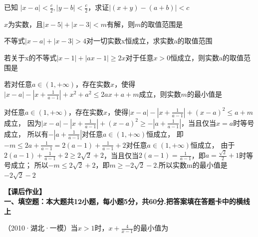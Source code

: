 \documentclass[11pt,a4paper]{ctexbook}
\begin{document}
\par
\begin{problem}
    已知 $\displaystyle |x-a|<\frac{c}{2},|y-b|<\frac{c}{2}$，求证$|(x+y)-(a+b)|<c$ 
\end{problem}

\par
\begin{problem}
    $x$为实数，且$|x-5|+|x-3|<m$有解，则$m$的取值范围是
\end{problem}

\par
\begin{problem}
    不等式$|x-a|+|x-3|>4$对一切实数x恒成立，求实数a的取值范围
\end{problem}

\par
\begin{problem}
    若关于x的不等式$|x-1|+|ax-1|\ge2x$对于任意$x>0$恒成立，则实数a的取值范围是\tiankong{$(-\infty,-1]\cup[3,+\infty)$} 
\end{problem}

\par
\begin{problem}
    若对任意$a\in(1,+\infty)$，存在实数$x$，使得$\displaystyle |x-a|-|x+\frac{1}{a-1}|+x^2+a^2\le 2ax+a+m$成立，则实数$m$的最小值是
    \begin{jiexi}
        对任意$a\in(1,+\infty)$，存在实数$x$，使得$\displaystyle |x-a|-|x+\frac{1}{a-1}|+(x-a)^2\le a+m$成立，
因为$\displaystyle |x-a|-|x+\frac{1}{a-1}|+(x-a)^2\ge -|a+\frac{1}{a-1}|$，当且仅当$x=a$时等号成立，
所以有$-|a+\frac{1}{a-1}|$对任意$a\in(1,+\infty)$恒成立，
即$\displaystyle -m\le 2a+\frac{1}{a-1}=2(a-1)+\frac{1}{a-1}+2$对任意$a\in(1,+\infty)$恒成立，
由于$\displaystyle 2(a-1)+\frac{1}{a-1}+2\ge 2\sqrt{2}+2$，当且仅当$\displaystyle 2(a-1)=\frac{1}{a-1}$，即$\displaystyle a=\frac{\sqrt{2}}{2}+1$时等号成立；
所以$-m\le2\sqrt{2}+2$，即$m\ge -2\sqrt{2}-2$.所以实数m的最小值是$-2\sqrt{2}-2$
    \end{jiexi}
\end{problem}

\clearpage
\textbf{【课后作业】}\\
\textbf{一、填空题：本大题共12小题，每小题5分，共60分.把答案填在答题卡中的横线上}

\begin{hmwk}
    （2010·湖北·一模）当$x>1$时，$\displaystyle x+\frac{4}{x-1}$的最小值为
\end{hmwk}
\end{document}
